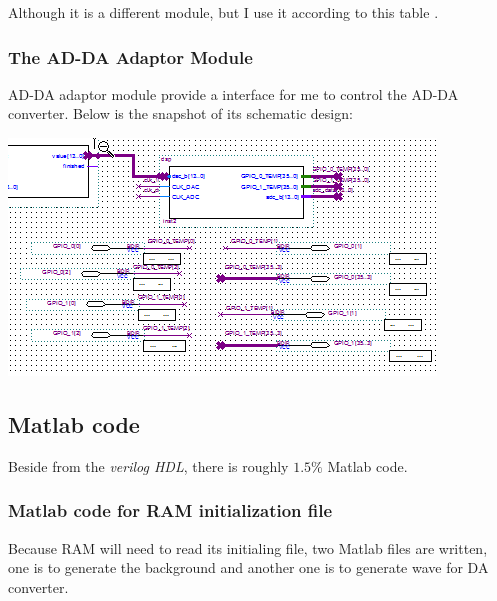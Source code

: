 \documentclass[11pt]{scrartcl}
\begin{document}
Although it is a different module, but I use it according to this table \cite{vgaadaptor}.

\subsubsection{The AD-DA Adaptor Module}
AD-DA adaptor module provide a interface for me to control the AD-DA converter. Below is the snapshot of its schematic design:

\begin{minipage}[t]{\linewidth}

{
\includegraphics[scale = 1]{adda.png}
}
\end{minipage}
\medskip

\subsection{Matlab code}

Beside from the \textit{verilog HDL}, there is roughly $1.5\%$ Matlab code.   
\subsubsection{Matlab code for RAM initialization file} 

Because RAM will need to read its initialing file, two Matlab files are written, one is to generate the background and another one is to generate wave for DA converter.\\
\end{document}
